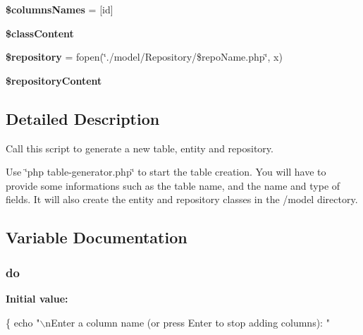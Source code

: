 \begin{DoxyCompactItemize}
\item 
{\bfseries \$columns\+Names} = \mbox{[}\textquotesingle{}id\textquotesingle{}\mbox{]}\hypertarget{table-generator_8php_a30cb304e4111c2f8268d0ac63e183947}{}\label{table-generator_8php_a30cb304e4111c2f8268d0ac63e183947}

\item 
{\bfseries \$class\+Content}\hypertarget{table-generator_8php_a44d64b8be6235c4e72646fc501e4cae9}{}\label{table-generator_8php_a44d64b8be6235c4e72646fc501e4cae9}

\item 
{\bfseries \$repository} = fopen(\char`\"{}./model/Repository/\$repo\+Name.\+php\char`\"{}, \textquotesingle{}x\textquotesingle{})\hypertarget{table-generator_8php_a116ab346146cc30fbffb7ffc52cbd1b3}{}\label{table-generator_8php_a116ab346146cc30fbffb7ffc52cbd1b3}

\item 
{\bfseries \$repository\+Content}\hypertarget{table-generator_8php_a7aa649b47af5da9621ae62712bcc4089}{}\label{table-generator_8php_a7aa649b47af5da9621ae62712bcc4089}

\end{DoxyCompactItemize}


\subsection{Detailed Description}
Call this script to generate a new table, entity and repository. 

Use \char`\"{}php table-\/generator.\+php\char`\"{} to start the table creation. You will have to provide some informations such as the table name, and the name and type of fields. It will also create the entity and repository classes in the /model directory. 

\subsection{Variable Documentation}
\subsubsection[{\texorpdfstring{do}{do}}]{\setlength{\rightskip}{0pt plus 5cm}do}\hypertarget{table-generator_8php_a721c6ff80a6d3e4ad4ffa52a04c60085}{}\label{table-generator_8php_a721c6ff80a6d3e4ad4ffa52a04c60085}
{\bfseries Initial value\+:}
\begin{DoxyCode}
\{
    echo \textcolor{stringliteral}{"\(\backslash\)nEnter a column name (or press Enter to stop adding columns): "}
\end{DoxyCode}
